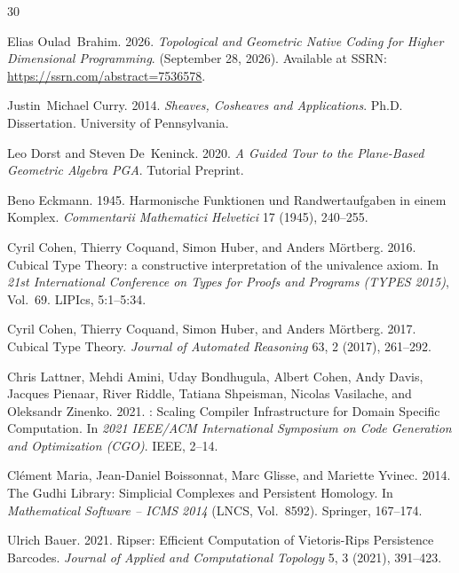 \documentclass[acmsmall,screen,nonacm]{acmart}
\begin{document}

\begin{thebibliography}{30}

Elias Oulad~Brahim. 2026.
\newblock \emph{Topological and Geometric Native Coding for Higher Dimensional Programming}.
\newblock (September 28, 2026). Available at SSRN: \url{https://ssrn.com/abstract=7536578}.

Justin~Michael Curry. 2014.
\newblock \emph{Sheaves, Cosheaves and Applications}.
\newblock Ph.D. Dissertation. University of Pennsylvania.

Leo Dorst and Steven De~Keninck. 2020.
\newblock \emph{A Guided Tour to the Plane-Based Geometric Algebra PGA}.
\newblock Tutorial Preprint.

Beno Eckmann. 1945.
\newblock Harmonische Funktionen und Randwertaufgaben in einem Komplex.
\newblock \emph{Commentarii Mathematici Helvetici} 17 (1945), 240--255.

Cyril Cohen, Thierry Coquand, Simon Huber, and Anders M{\"o}rtberg. 2016.
\newblock Cubical Type Theory: a constructive interpretation of the univalence axiom.
\newblock In \emph{21st International Conference on Types for Proofs and Programs (TYPES 2015)}, Vol.~69. LIPIcs, 5:1--5:34.

Cyril Cohen, Thierry Coquand, Simon Huber, and Anders M{\"o}rtberg. 2017.
\newblock Cubical Type Theory.
\newblock \emph{Journal of Automated Reasoning} 63, 2 (2017), 261--292.

Chris Lattner, Mehdi Amini, Uday Bondhugula, Albert Cohen, Andy Davis, Jacques Pienaar, River Riddle, Tatiana Shpeisman, Nicolas Vasilache, and Oleksandr Zinenko. 2021.
: Scaling Compiler Infrastructure for Domain Specific Computation.
\newblock In \emph{2021 IEEE/ACM International Symposium on Code Generation and Optimization (CGO)}. IEEE, 2--14.

Cl{\'e}ment Maria, Jean-Daniel Boissonnat, Marc Glisse, and Mariette Yvinec. 2014.
\newblock The {Gudhi} Library: Simplicial Complexes and Persistent Homology.
\newblock In \emph{Mathematical Software -- ICMS 2014} (LNCS, Vol.~8592). Springer, 167--174.

Ulrich Bauer. 2021.
\newblock Ripser: Efficient Computation of Vietoris-Rips Persistence Barcodes.
\newblock \emph{Journal of Applied and Computational Topology} 5, 3 (2021), 391--423.


\end{thebibliography}
\end{document}
